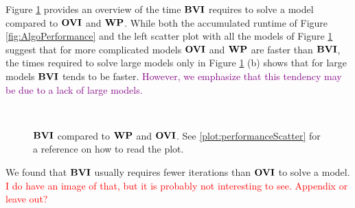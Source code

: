 Figure \ref{fig:BVIvsWPvsOVI} provides an overview of the time $\mathbf{BVI}$ requires to solve a model compared to $\mathbf{OVI}$ and $\mathbf{WP}$.
While both the accumulated runtime of Figure \ref{fig:AlgoPerformance} and the left scatter plot with all the models of Figure \ref{fig:BVIvsWPvsOVI}
suggest that for more complicated models $\mathbf{OVI}$ and $\mathbf{WP}$ are faster than $\mathbf{BVI}$, the times required to solve large models only in Figure \ref{fig:BVIvsWPvsOVI} (b)
shows that for large models $\mathbf{BVI}$ tends to be faster. \textcolor{purple}{However, we emphasize that this tendency may be due to a lack of large models.}

\begin{figure}[h!]
    \centering
    \
    \caption{$\mathbf{BVI}$ compared to $\mathbf{WP}$ and $\mathbf{OVI}$. See \ref{plot:performanceScatter} for a reference on how to read the plot.}%
    \label{fig:BVIvsWPvsOVI}%
    \end{figure}
\FloatBarrier

We found that $\mathbf{BVI}$ usually requires fewer iterations than $\mathbf{OVI}$ to solve a model. 
\textcolor{red}{I do have an image of that, but it is probably not interesting to see. Appendix or leave out?}

